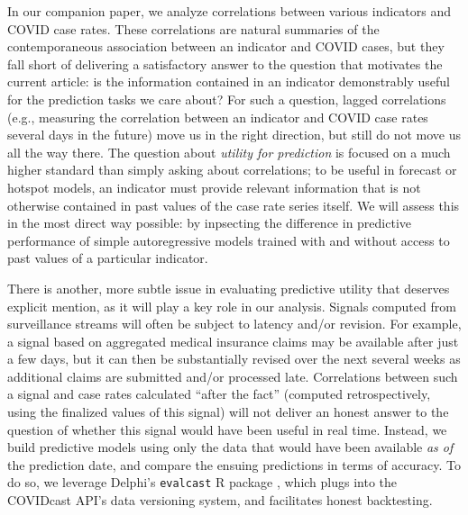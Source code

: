 \documentclass[9pt,twocolumn,twoside,lineno]{pnas-new}
\begin{document}
In our companion paper, we analyze correlations between various indicators and   
COVID case rates. These correlations are natural summaries of the
contemporaneous association between an indicator and COVID cases, but they fall 
short of delivering a satisfactory answer to the question that motivates the
current article: is the information contained in an indicator demonstrably
useful for the prediction tasks we care about? For such a question, lagged
correlations (e.g., measuring the correlation between an indicator and COVID
case rates several days in the future) move us in the right direction, but still
do not move us all the way there. The question about \textit{utility for 
  prediction} is focused on a much higher standard than simply asking 
about correlations; to be useful in forecast or hotspot models, an indicator
must provide relevant information that is not otherwise contained in past values
of the case rate series itself. We will assess this in the most direct way
possible: by inpsecting the difference in predictive performance of simple
autoregressive models trained with and without access to past values of a
particular indicator.   

There is another, more subtle issue in evaluating predictive utility that 
deserves explicit mention, as it will play a key role in our analysis.
Signals computed from surveillance streams will often be subject to  
latency and/or revision. For example, a signal based on aggregated medical
insurance claims may be available after just a few days, but it can then be
substantially revised over the next several weeks as additional claims are
submitted and/or processed late. Correlations between such a signal and case
rates calculated ``after the fact'' (computed retrospectively, using the
finalized values of this signal) will not deliver an honest answer to the    
question of whether this signal would have been useful in real time. Instead,
we build predictive models using only the data that would have been available
\textit{as of} the prediction date, and compare the ensuing predictions in terms 
of accuracy. To do so, we leverage Delphi's \texttt{evalcast} R package 
\cite{EvalcastR}, which plugs into the COVIDcast API's data versioning system,  
and facilitates honest backtesting. 
\end{document}
